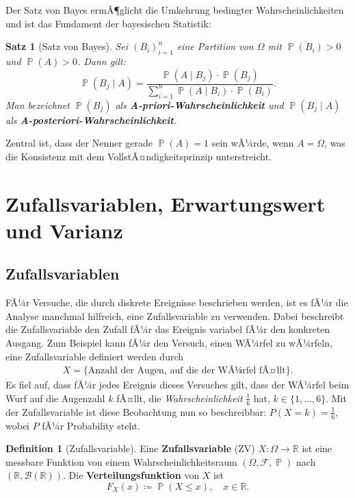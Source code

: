 ﻿\documentclass[12pt,a4paper]{article}
\theoremstyle{definition}
\newtheorem{definition}{Definition}[section]
\theoremstyle{plain}
\newtheorem{satz}{Satz}[section]
\theoremstyle{remark}
\DeclareMathOperator{\Prob}{\mathbb{P}}
\begin{document}
Der Satz von Bayes ermÃ¶glicht die Umkehrung bedingter Wahrscheinlichkeiten
und ist das Fundament der bayesischen Statistik:

\begin{satz}[Satz von Bayes]\label{satz:bayes}
  Sei $(B_i)_{i=1}^{n}$ eine Partition von $\Omega$ mit $\Prob(B_i) > 0$ und
  $\Prob(A) > 0$. Dann gilt:
  \[
    \Prob(B_j \mid A)
    = \frac{\Prob(A \mid B_j) \cdot \Prob(B_j)}{\sum_{i=1}^{n} \Prob(A \mid B_i) \cdot \Prob(B_i)}.
  \]
  Man bezeichnet $\Prob(B_j)$ als \textbf{A-priori-Wahr\-schein\-lich\-keit} und
  $\Prob(B_j \mid A)$ als \textbf{A-pos\-te\-rio\-ri-Wahr\-schein\-lich\-keit}.
\end{satz}

Zentral ist, dass der Nenner gerade $\Prob(A) = 1$ sein wÃ¼rde, wenn $A = \Omega$,
was die Konsistenz mit dem VollstÃ¤ndigkeitsprinzip unterstreicht.

\section{Zufallsvariablen, Erwartungswert und Varianz}
\label{sec:erwartungswert}

\subsection{Zufallsvariablen}

FÃ¼r Versuche, die durch diskrete Ereignisse beschrieben werden, ist es fÃ¼r
die Analyse manchmal hilfreich, eine Zufallsvariable zu verwenden. Dabei
beschreibt die Zufallsvariable den Zufall fÃ¼r das Ereignis variabel fÃ¼r den
konkreten Ausgang. Zum Beispiel kann fÃ¼r den Versuch, einen WÃ¼rfel zu wÃ¼rfeln,
eine Zufallsvariable definiert werden durch
\begin{align}
  \label{math:var-x}
  X = \{\text{Anzahl der Augen, auf die der WÃ¼rfel fÃ¤llt}\}.
\end{align}
Es fiel auf, dass fÃ¼r jedes Ereignis dieses Versuches gilt, dass der WÃ¼rfel
beim Wurf auf die Augenzahl $k$ fÃ¤llt, die \textit{Wahrscheinlichkeit}
$\frac{1}{6}$ hat, $k \in \{1, \ldots, 6\}$. Mit der Zufallsvariable ist
diese Beobachtung nun so beschreibbar: $P(X = k) = \frac{1}{6}$, wobei $P$
fÃ¼r Probability steht.

\begin{definition}[Zufallsvariable]\label{def:zufvar}
  Eine \textbf{Zufallsvariable} (ZV) $X\colon \Omega \to \mathbb{R}$ ist eine
  messbare Funktion von einem Wahrscheinlichkeitsraum $(\Omega,\mathcal{F},\Prob)$
  nach $(\mathbb{R}, \mathcal{B}(\mathbb{R}))$. Die
  \textbf{Verteilungsfunktion} von $X$ ist
  \[
    F_X(x) \coloneqq \Prob(X \leq x), \quad x \in \mathbb{R}.
  \]
\end{definition}
\end{document}
